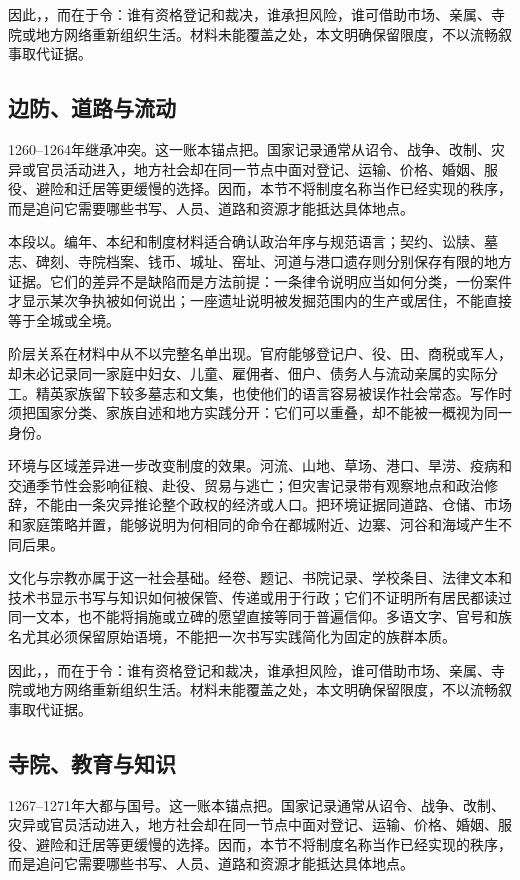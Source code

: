 因此，，而在于令：谁有资格登记和裁决，谁承担风险，谁可借助市场、亲属、寺院或地方网络重新组织生活。材料未能覆盖之处，本文明确保留限度，不以流畅叙事取代证据。

\subsection{边防、道路与流动}

1260--1264年继承冲突。这一账本锚点把。国家记录通常从诏令、战争、改制、灾异或官员活动进入，地方社会却在同一节点中面对登记、运输、价格、婚姻、服役、避险和迁居等更缓慢的选择。因而，本节不将制度名称当作已经实现的秩序，而是追问它需要哪些书写、人员、道路和资源才能抵达具体地点。

本段以。编年、本纪和制度材料适合确认政治年序与规范语言；契约、讼牍、墓志、碑刻、寺院档案、钱币、城址、窑址、河道与港口遗存则分别保存有限的地方证据。它们的差异不是缺陷而是方法前提：一条律令说明应当如何分类，一份案件才显示某次争执被如何说出；一座遗址说明被发掘范围内的生产或居住，不能直接等于全城或全境。

阶层关系在材料中从不以完整名单出现。官府能够登记户、役、田、商税或军人，却未必记录同一家庭中妇女、儿童、雇佣者、佃户、债务人与流动亲属的实际分工。精英家族留下较多墓志和文集，也使他们的语言容易被误作社会常态。写作时须把国家分类、家族自述和地方实践分开：它们可以重叠，却不能被一概视为同一身份。

环境与区域差异进一步改变制度的效果。河流、山地、草场、港口、旱涝、疫病和交通季节性会影响征粮、赴役、贸易与逃亡；但灾害记录带有观察地点和政治修辞，不能由一条灾异推论整个政权的经济或人口。把环境证据同道路、仓储、市场和家庭策略并置，能够说明为何相同的命令在都城附近、边寨、河谷和海域产生不同后果。

文化与宗教亦属于这一社会基础。经卷、题记、书院记录、学校条目、法律文本和技术书显示书写与知识如何被保管、传递或用于行政；它们不证明所有居民都读过同一文本，也不能将捐施或立碑的愿望直接等同于普遍信仰。多语文字、官号和族名尤其必须保留原始语境，不能把一次书写实践简化为固定的族群本质。

因此，，而在于令：谁有资格登记和裁决，谁承担风险，谁可借助市场、亲属、寺院或地方网络重新组织生活。材料未能覆盖之处，本文明确保留限度，不以流畅叙事取代证据。

\subsection{寺院、教育与知识}

1267--1271年大都与国号。这一账本锚点把。国家记录通常从诏令、战争、改制、灾异或官员活动进入，地方社会却在同一节点中面对登记、运输、价格、婚姻、服役、避险和迁居等更缓慢的选择。因而，本节不将制度名称当作已经实现的秩序，而是追问它需要哪些书写、人员、道路和资源才能抵达具体地点。

